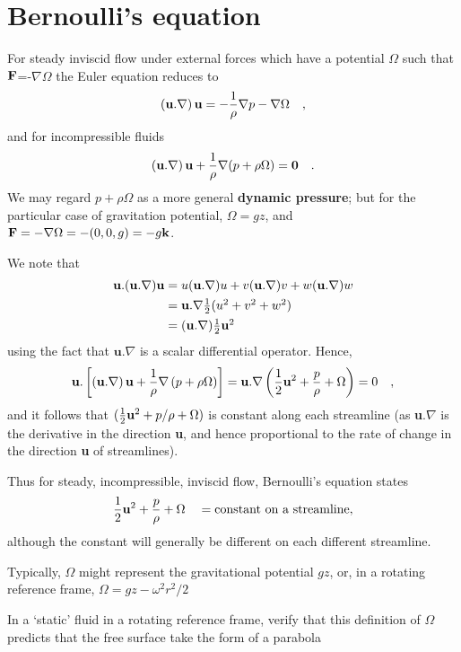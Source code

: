 \documentclass[10pt]{report}
\begin{document}
\section{Bernoulli's equation}
For steady inviscid flow under external forces which have a potential
$\Omega $ such that ${{\bf F}}$=-$\nabla \Omega $ the Euler equation
reduces to
\[
\left( {{{\bf u}}. \nabla } \right){{\bf
u}}=-\frac{1}{\rho }\nabla p-\nabla \Omega \quad ,
\]
and for incompressible fluids
\[
\left( {{{\bf u}}. \nabla } \right){{\bf
u}}+\frac{1}{\rho }\nabla (p+\rho \Omega )={{\bf
0}}\quad .
\]
We may regard $p + \rho \Omega $ as a more general \textbf{dynamic
pressure}; but for the particular case of gravitation potential, $\Omega  =
gz$, and ${{\bf F}}=-\nabla \Omega
=-(0,0,g)=-g{{\bf k}}$.

We note that
\begin{align*}
{{\bf u}}. ({{\bf u}}. \nabla ){{\bf
u}} & =u({{\bf u}}. \nabla )u+v({{\bf
u}}. \nabla )v+w({{\bf u}}. \nabla )w
\\\
&
={{\bf u}}. \nabla \textstyle{1 \over
2}(u^2+v^2+w^2)
\\
&
=({{\bf u}}. \nabla )\textstyle{1 \over 2}{{\bf u}}^2
\end{align*}
using the fact that $\textbf{u}.  \nabla $ is a scalar differential
operator. Hence,
\[
{{\bf u}}. \left[ {\left( {{{\bf u}}. \nabla }
\right){{\bf u}}+\frac{1}{\rho }\nabla \left( {p+\rho
\Omega } \right)} \right]={{\bf u}}. \nabla \left(
{{1 \over 2}{{\bf u}}^2+\frac{p}{\rho }+\Omega
} \right)=0\quad ,
\]
and it follows that $(\textstyle{1 \over 2}{{\bf u}}^2+p /
\rho +\Omega )$ is constant along each streamline (as \textbf{u}$.
\nabla $ is the derivative in the direction \textbf{u}, and hence
proportional to the rate of change in the direction \textbf{u} of
streamlines).

Thus for steady, incompressible, inviscid flow, Bernoulli's equation states
\begin{equation}
{1 \over 2}{{\bf u}}^2+\frac{p}{\rho
}+\Omega \quad = \hbox{constant on a streamline},
\end{equation}
although the constant will generally be different on each different
streamline.

Typically, $\Omega$ might represent the gravitational potential $gz$,
or, in a rotating reference frame, $\Omega = gz - \omega^{2}r^{2}/2 $

\begin{examplebox}
In a `static' fluid in a rotating reference frame,
verify that this definition of $\Omega$ predicts that the free surface take the form of a parabola
\end{examplebox}
\end{document}
